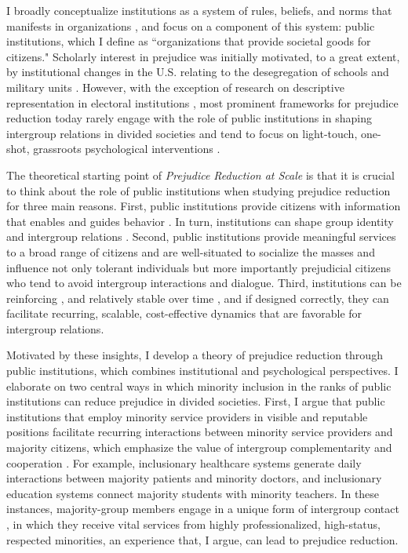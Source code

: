 \documentclass[12pt]{article}
\theoremstyle{plain}
\begin{document}
I broadly conceptualize institutions as a system of rules, beliefs, and norms that manifests in organizations \citep{Greif:2006vz}, and focus on a component of this system: public institutions, which I define as ``organizations that provide societal goods for citizens." Scholarly interest in prejudice was initially motivated, to a great extent, by institutional changes in the U.S. relating to the desegregation of schools and military units \citep{Allport1954}. However, with the exception of research on descriptive representation in electoral institutions \citep{Chauchard:2014aa,Chauchard:2017aa}, most prominent frameworks for prejudice reduction today rarely engage with the role of public institutions in shaping intergroup relations in divided societies and tend to focus on light-touch, one-shot, grassroots psychological interventions \citep{Paluck:2020aa}.%


The theoretical starting point of \emph{Prejudice Reduction at Scale} is that it is crucial to think about the role of public institutions when studying prejudice reduction for three main reasons. First, public institutions provide citizens with information that enables and guides behavior \citep{Greif:2006vz}. In turn, institutions can shape group identity and intergroup relations \citep{Posner:2005vn}. Second, public institutions provide meaningful services to a broad range of citizens \citep{Pepinsky:2017aa} and are well-situated to socialize the masses and influence not only tolerant individuals but more importantly prejudicial citizens who tend to avoid intergroup interactions and dialogue. Third, institutions can be reinforcing \citep{Greif:2004uz}, and relatively stable over time \citep{Thelen:1999wi}, and if designed correctly, they can facilitate recurring, scalable, cost-effective dynamics that are favorable for intergroup relations. 


Motivated by these insights, I develop a theory of prejudice reduction through public institutions, which combines institutional and psychological perspectives. I elaborate on two central ways in which minority inclusion in the ranks of public institutions can reduce prejudice in divided societies. First, I argue that public institutions that employ minority service providers in visible and reputable positions facilitate recurring interactions between minority service providers and majority citizens, which emphasize the value of intergroup complementarity and cooperation \citep{Jha:2013aa,Jha:2022wp}. For example, inclusionary healthcare systems generate daily interactions between majority patients and minority doctors, and inclusionary education systems connect majority students with minority teachers. In these instances, majority-group members engage in a unique form of intergroup contact \citep{Allport1954}, in which they receive vital services from highly professionalized, high-status, respected minorities, an experience that, I argue, can lead to prejudice reduction. 
\end{document}
